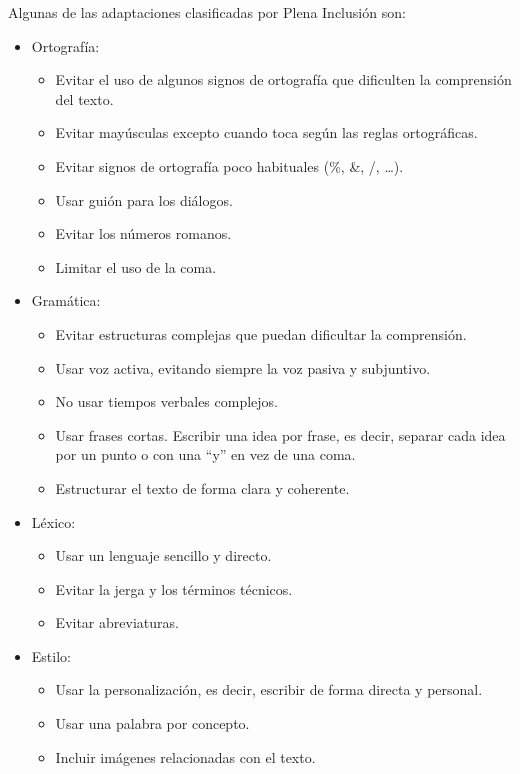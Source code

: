 Algunas de las adaptaciones clasificadas por Plena Inclusión \citep{LFMetodos} son:
	\begin{itemize}
\item Ortografía:
\begin{itemize}
	\item Evitar el uso de algunos signos de ortografía que dificulten la comprensión del texto.

		\item Evitar mayúsculas excepto cuando toca según las reglas ortográficas.
	
			\item Evitar signos de ortografía poco habituales (\%, \&, /, …).
				\item Usar guión para los diálogos.
					\item Evitar los números romanos.
						\item Limitar el uso de la coma.


 
 \end{itemize}

\item Gramática:
\begin{itemize}
	\item Evitar estructuras complejas que puedan dificultar la comprensión.

		\item Usar voz activa, evitando siempre la voz pasiva y subjuntivo.

			\item No usar tiempos verbales complejos.

				\item Usar frases cortas. Escribir una idea por frase, es decir, separar cada idea por un punto o con una ``y'' en vez de una coma. 

					\item Estructurar el texto de forma clara y coherente.
\end{itemize}


\item Léxico:
\begin{itemize}
	\item Usar un lenguaje sencillo y directo. 
		\item Evitar la jerga y los términos técnicos. 
			\item Evitar abreviaturas.    	
 \end{itemize}

\item Estilo:

\begin{itemize}
	\item Usar la personalización, es decir, escribir de forma directa y personal. 

	\item Usar una palabra por concepto.
	

	\item Incluir imágenes relacionadas con el texto.
 \end{itemize}
 \end{itemize}
